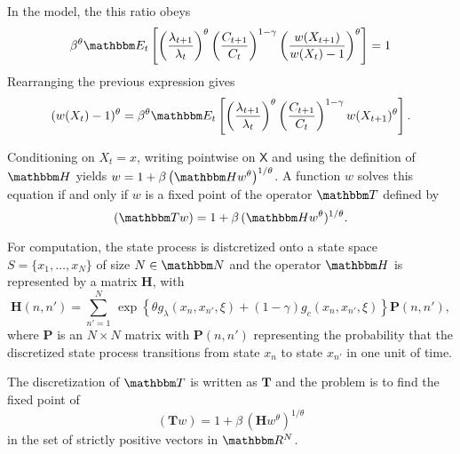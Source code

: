 \documentclass[12pt, reqno]{amsart}
\newcommand{\1}{\mathbbm 1}
\newcommand{\RR}{\mathbbm R}
\newcommand{\NN}{\mathbbm N}
\newcommand{\TT}{\mathbbm T}
\newcommand{\HH}{\mathbbm H}
\newcommand{\EE}{\mathbbm E}
\newcommand{\bH}{\mathbf H}
\newcommand{\bT}{\mathbf T}
\newcommand{\XX}{\mathsf X}
\newcommand{\bP}{\mathbf P}
\theoremstyle{plain}
\theoremstyle{definition}
\begin{document}
In the model, the this ratio obeys
%
\begin{equation*}
    \beta^{\theta}
    \EE_t
    \left[
    \left( \frac{\lambda_{t+1}}{\lambda_t} \right)^\theta
        \left( \frac{C_{t+1}}{C_t} \right)^{1-\gamma}
        \left( \frac{w(X_{t+1})}{w(X_t)-1} \right)^\theta
    \right] = 1
\end{equation*}
%
Rearranging the previous expression gives
%
\begin{equation*}
    (w(X_t)-1)^\theta
    = \beta^{\theta}
    \EE_t
    \left[
    \left( \frac{\lambda_{t+1}}{\lambda_t} \right)^\theta
        \left( \frac{C_{t+1}}{C_t} \right)^{1-\gamma}
        w(X_{t+1})^\theta
    \right].
\end{equation*}
%

Conditioning on $X_t = x$, writing pointwise on $\XX$ and using the definition
of $\HH$ yields $w = 1 + \beta \left( \HH w^\theta \right)^{1/\theta}$.  A
function $w$ solves this equation if and only if $w$ is a fixed point
of the operator $\TT$ defined by 
%
\begin{equation}\label{eq:wcop}
    (\TT w) = 1 + \beta \,  (\HH w^\theta)^{1/\theta}.
\end{equation}
%

For computation, the state process is distcretized onto a state space $S =
\{x_1, \ldots, x_N\}$ of size $N \in \NN$ and the operator $\HH$ is
represented by a matrix $\bH$, with 
%
\begin{equation}\label{eq:defkb}
    \bH(n, n') = \sum_{n'=1}^N 
        \,
        \exp
        \left\{ 
            \theta g_\lambda(x_n, x_{n'}, \xi) 
            + (1-\gamma) g_c(x_n, x_{n'}, \xi)
        \right\}
    \bP(n, n'),
\end{equation}
%
where $\bP$ is an $N \times N$ matrix with  $\bP(n, n')$ representing the
probability that the discretized state process transitions from state $x_n$ to
state $x_{n'}$ in one unit of time.

The discretization of $\TT$ is written as $\bT$ and the problem is to find the
fixed point of 
%
\begin{equation}\label{eq:wcopd}
    (\bT w) = 1 + \beta \,  (\bH w^\theta)^{1/\theta}
\end{equation}
%
in the set of strictly positive vectors in $\RR^N$.








\end{document}
